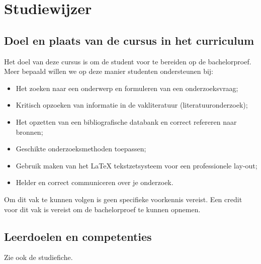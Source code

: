\chapter*{Studiewijzer}%
\label{ch:studiewijzer}

\section{Doel en plaats van de cursus in het curriculum}%
\label{sec:doel-en-plaats}

Het doel van deze cursus is om de student voor te bereiden op de bachelorproef. Meer bepaald willen we op deze manier studenten ondersteunen bij:

\begin{itemize}
  \item Het zoeken naar een onderwerp en formuleren van een onderzoeksvraag;
  \item Kritisch opzoeken van informatie in de vakliteratuur (literatuuronderzoek);
  \item Het opzetten van een bibliografische databank en correct refereren naar bronnen;
  \item Geschikte onderzoeksmethoden toepassen;
  \item Gebruik maken van het {\LaTeX} tekstzetsysteem voor een professionele lay-out;
  \item Helder en correct communiceren over je onderzoek.
\end{itemize}

Om dit vak te kunnen volgen is geen specifieke voorkennis vereist. Een credit voor dit vak is vereist om de bachelorproef te kunnen opnemen.

\section{Leerdoelen en competenties}%
\label{sec:leerdoelen}

Zie ook de studiefiche.

